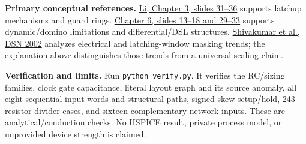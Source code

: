 \documentclass[10pt]{article}
\begin{document}
\textbf{Primary conceptual references.} \href{https://www.ee.ncu.edu.tw/jfli/public_html/VLSI/lecture/ch03.pdf}{Li, Chapter 3, slides 31--36} supports latchup mechanisms and guard rings. \href{https://www.ee.ncu.edu.tw/jfli/public_html/VLSI/lecture/ch06.pdf}{Chapter 6, slides 13--18 and 29--33} supports dynamic/domino limitations and differential/DSL structures. \href{https://users.cs.utah.edu/~rajeev/cs7810/papers/shivakumar02.pdf}{Shivakumar et al., DSN 2002} analyzes electrical and latching-window masking trends; the explanation above distinguishes those trends from a universal scaling claim.

\textbf{Verification and limits.} Run \texttt{python verify.py}. It verifies the RC/sizing families, clock gate capacitance, literal layout graph and its source anomaly, all eight sequential input words and structural paths, signed-skew setup/hold, 243 resistor-divider cases, and sixteen complementary-network inputs. These are analytical/conduction checks. No HSPICE result, private process model, or unprovided device strength is claimed.
\end{document}
